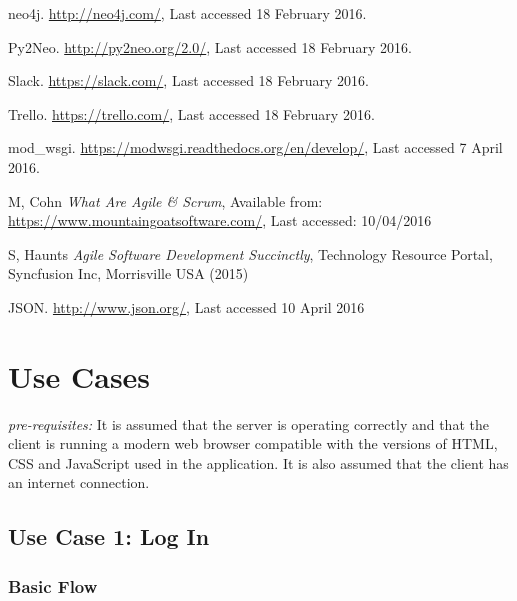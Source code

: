 \documentclass[12pt,onecolumn]{article}
\begin{document}
\begin{thebibliography}{1}
		 neo4j. \url{http://neo4j.com/}, Last accessed 18 February 2016.
		
		 Py2Neo. \url{http://py2neo.org/2.0/}, Last accessed 18 February 2016.
		
		 Slack. \url{https://slack.com/}, Last accessed 18 February 2016.
		
		 Trello. \url{https://trello.com/}, Last accessed 18 February 2016.
		
		 mod\_wsgi. \url{https://modwsgi.readthedocs.org/en/develop/}, Last accessed 7 April 2016.
		
		
		 M, Cohn \emph{What Are Agile \& Scrum}, Available from: \url{https://www.mountaingoatsoftware.com/}, Last accessed: 10/04/2016
		
		 S, Haunts \emph{Agile Software Development Succinctly}, Technology Resource Portal, Syncfusion Inc, Morrisville USA (2015)
		
		 JSON. \url{http://www.json.org/}, Last accessed 10 April 2016
		
		
	\end{thebibliography}
	
	\newpage
	
	\appendix
	
	\section{Use Cases} \label{moreusecase}
	
	\emph{pre-requisites:} It is assumed that the server is operating correctly and that the client is running a modern web browser compatible with the versions of HTML, CSS and JavaScript used in the application. It is also assumed that the client has an internet connection.
	
	\subsection{Use Case 1: Log In}

		\subsubsection{Basic Flow}
\end{document}

